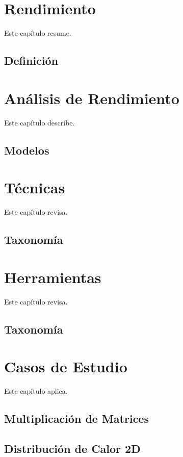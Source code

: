 \documentclass[a4paper]{report}
\begin{document}
\chapter{Rendimiento}

Este cap\'itulo resume.

\section{Definici\'on}

\chapter{An\'alisis de Rendimiento}

Este cap\'itulo describe.

\section{Modelos}

\chapter{T\'ecnicas}

Este cap\'itulo revisa.

\section{Taxonom\'ia}

\chapter{Herramientas}

Este cap\'itulo revisa.

\section{Taxonom\'ia}

\chapter{Casos de Estudio}

Este cap\'itulo aplica.

\section{Multiplicaci\'on de Matrices}

\section{Distribuci\'on de Calor 2D}
\end{document}
